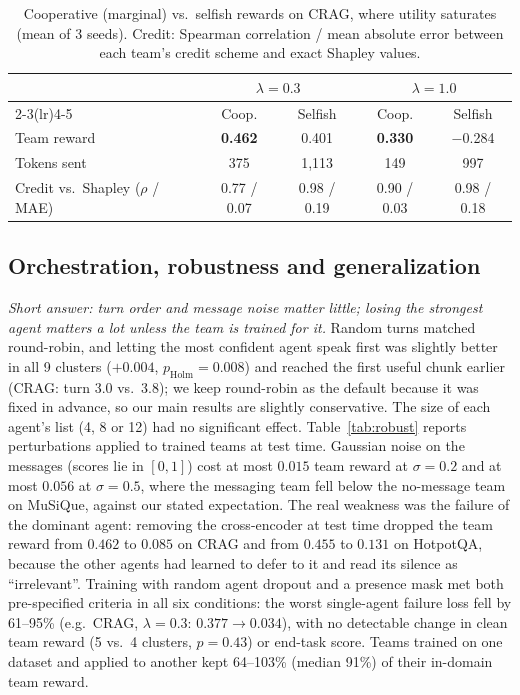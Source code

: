 \documentclass[sigconf,anonymous]{aamas}
\theoremstyle{plain}
\theoremstyle{definition}
\begin{document}
\begin{table}[t]
\centering\small
\caption{Cooperative (marginal) vs.\ selfish rewards on CRAG, where utility saturates (mean of 3 seeds). Credit: Spearman correlation / mean absolute error between each team's credit scheme and exact Shapley values.}
\label{tab:dilemma}
\setlength{\tabcolsep}{3pt}
\begin{tabular}{l cc cc}
\toprule
 & \multicolumn{2}{c}{$\lambda=0.3$} & \multicolumn{2}{c}{$\lambda=1.0$} \\
\cmidrule(lr){2-3}\cmidrule(lr){4-5}
 & Coop. & Selfish & Coop. & Selfish \\
\midrule
Team reward & \textbf{0.462} & 0.401 & \textbf{0.330} & $-$0.284 \\
Tokens sent & 375 & 1{,}113 & 149 & 997 \\
Credit vs.\ Shapley ($\rho$ / MAE) & 0.77 / 0.07 & 0.98 / 0.19 & 0.90 / 0.03 & 0.98 / 0.18 \\
\bottomrule
\end{tabular}
\end{table}

\subsection{Orchestration, robustness and generalization}

\emph{Short answer: turn order and message noise matter little; losing the strongest agent matters a lot unless the team is trained for it.} Random turns matched round-robin, and letting the most confident agent speak first was slightly better in all 9 clusters ($+0.004$, $p_{\mathrm{Holm}}=0.008$) and reached the first useful chunk earlier (CRAG: turn 3.0 vs.\ 3.8); we keep round-robin as the default because it was fixed in advance, so our main results are slightly conservative. The size of each agent's list (4, 8 or 12) had no significant effect. Table~\ref{tab:robust} reports perturbations applied to trained teams at test time. Gaussian noise on the messages (scores lie in $[0,1]$) cost at most $0.015$ team reward at $\sigma=0.2$ and at most $0.056$ at $\sigma=0.5$, where the messaging team fell below the no-message team on MuSiQue, against our stated expectation. The real weakness was the failure of the dominant agent: removing the cross-encoder at test time dropped the team reward from $0.462$ to $0.085$ on CRAG and from $0.455$ to $0.131$ on HotpotQA, because the other agents had learned to defer to it and read its silence as ``irrelevant''. Training with random agent dropout and a presence mask met both pre-specified criteria in all six conditions: the worst single-agent failure loss fell by 61--95\% (e.g.\ CRAG, $\lambda=0.3$: $0.377\to0.034$), with no detectable change in clean team reward (5 vs.\ 4 clusters, $p=0.43$) or end-task score. Teams trained on one dataset and applied to another kept 64--103\% (median 91\%) of their in-domain team reward.
\end{document}
